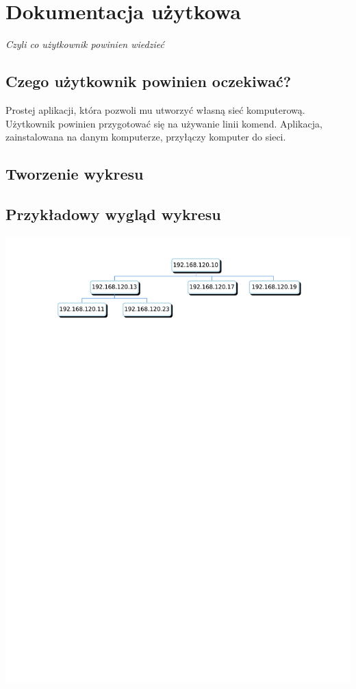 \section{Dokumentacja użytkowa}

\begin{center}
\textit{Czyli co użytkownik powinien wiedzieć}
\end{center}



\subsection{Czego użytkownik powinien oczekiwać?}
Prostej aplikacji, która pozwoli mu utworzyć własną sieć komputerową. Użytkownik powinien przygotować się na używanie linii komend.
Aplikacja, zainstalowana na danym komputerze, przyłączy komputer do sieci.

\subsection{Tworzenie wykresu}


\subsection{Przykładowy wygląd wykresu}

\includegraphics[width=1.0\textwidth]{chart.jpg}

